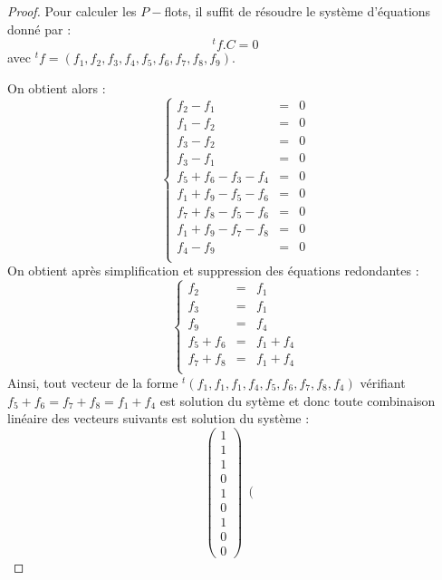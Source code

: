 \begin{proof}
    Pour calculer les $P-$flots, il suffit de résoudre le système d'équations donné par : \[
        ^tf.C = 0
    \]
    avec $^tf = (f_1, f_2, f_3, f_4, f_5, f_6, f_7, f_8, f_9)$.

    On obtient alors : \[
        \left \lbrace \begin{array}{rcl}
            f_2 - f_1 & = & 0 \\
            f_1 - f_2 & = & 0 \\
            f_3 - f_2 & = & 0 \\
            f_3 - f_1 & = & 0 \\
            f_5 + f_6 - f_3 - f_4 & = & 0 \\
            f_1 + f_9 - f_5 - f_6 & = & 0 \\
            f_7 + f_8 - f_5 - f_6 & = & 0 \\
            f_1 + f_9 - f_7 - f_8 & = & 0 \\
            f_4 - f_9 & = & 0 \\
        \end{array}
        \right .
    \]
     On obtient après simplification et suppression des équations redondantes : \[
        \left \lbrace \begin{array}{rcl}
            f_2 & = & f_1 \\
            f_3 & = & f_1 \\
            f_9 & = & f_4 \\
            f_5 + f_6 & = & f_1 + f_4 \\
            f_7 + f_8 & = & f_1 + f_4 \\
        \end{array}
        \right .
    \]
    Ainsi, tout vecteur de la forme $^t(f_1, f_1, f_1, f_4, f_5, f_6, f_7, f_8, f_4)$ vérifiant $f_5
    + f_6 = f_7 + f_8 = f_1 + f_4$ est solution du sytème et donc toute combinaison linéaire des
    vecteurs suivants est solution du système : \[
        \left ( \begin{array}{c}
            1 \\ 1 \\ 1 \\ 0 \\ 1 \\ 0 \\ 1 \\ 0 \\ 0
        \end{array} \right ) \ 
        \left ( \begin{array}{c}

\end{array}\]
\end{proof}
